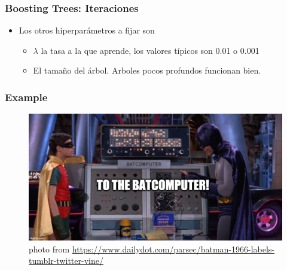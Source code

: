 \documentclass[
  shownotes,
  xcolor={svgnames},
  hyperref={colorlinks,citecolor=DarkBlue,linkcolor=andesred,urlcolor=DarkBlue}
  , aspectratio=169]{beamer}
\begin{document}
\begin{frame}[fragile]
\frametitle{Boosting Trees: Iteraciones}

\begin{itemize}

\item Los otros hiperparámetros a fijar son
\bigskip
\begin{itemize}
  \item $\lambda$ la tasa a la que aprende, los valores típicos son 0.01 o 0.001
\bigskip
\item El tamaño del árbol. Arboles pocos profundos funcionan bien.
\end{itemize}
\end{itemize}
\end{frame}
\begin{frame}[fragile]
\frametitle{Example}
\begin{figure}[H] \centering
  \centering
  \includegraphics[scale=0.35]{figures/baticomputer_meme.jpg}
  \\
  \tiny photo from \url{https://www.dailydot.com/parsec/batman-1966-labels-tumblr-twitter-vine/}
\end{figure}


\end{frame}

\end{document}
